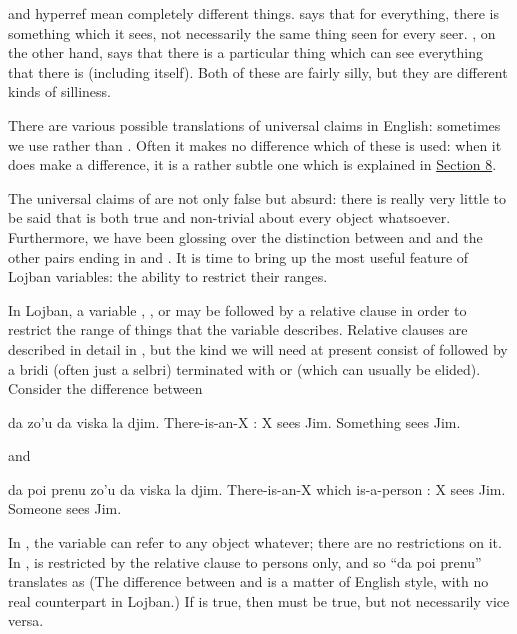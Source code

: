  and hyperref
    mean completely different things.  says that for everything, there is something which it
    sees, not necessarily the same thing seen for every seer. , on the other hand, says that
    there is a particular thing which can see everything that there
    is (including itself). Both of these are fairly silly, but they
    are different kinds of silliness. 

There are various possible translations of universal claims
    in English: sometimes we use  rather than
    . Often it makes no difference which of
    these is used: when it does make a difference, it is a rather
    subtle one which is explained in \hyperref[sec:16:8]{Section
    8}.




The universal claims of  are not
    only false but absurd: there is really very little to be said
    that is both true and non-trivial about every object
    whatsoever. Furthermore, we have been glossing over the
    distinction between  and  and the
    other pairs ending in  and . It is time to
    bring up the most useful feature of Lojban variables: the
    ability to restrict their ranges.

In Lojban, a variable , , or  may be
    followed by a  relative clause in order to restrict the
    range of things that the variable describes. Relative clauses
    are described in detail in ,
    but the kind we will need at present consist of 
    followed by a bridi (often just a selbri) terminated with
     or  (which can usually be elided). Consider the
    difference between
\begin{example}
da zo'u da viska la djim.\n
There-is-an-X : X sees Jim.\n
Something sees Jim.
\end{example}

{\noindent}and
\begin{example}
da poi prenu zo'u da viska la djim.\n
There-is-an-X which is-a-person : X sees Jim.\n
Someone sees Jim.
\end{example}

In , the variable  can
    refer to any object whatever; there are no restrictions on it.
    In ,  is restricted by the
     relative clause to persons only, and so ``da poi
    prenu'' translates as  (The difference between
     and  is a matter of English style, with
    no real counterpart in Lojban.) If  is true, then  must be
    true, but not necessarily vice versa. 

